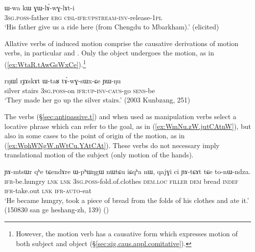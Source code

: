 \begin{exe}
\ex \label{ex:GWlAwGlAti}
\gll  ɯ-wa kɯ ɣɯ-lɤ́-wɣ-lɤt-i \\
\textsc{3sg}.\textsc{poss}-father \textsc{erg} \textsc{cisl}-\textsc{ifr}:\textsc{upstream}-\textsc{inv}-release-\textsc{1pl} \\
\glt `His father give us a ride here (from Chengdu to Mbarkham).' (elicited)
\end{exe}

Allative verbs of induced motion comprise the causative derivations of motion verbs, in particular  and . Only the object undergoes the motion, as in (\ref{ex:WtaR.tAwGsWxCe}).\footnote{However, the motion verb  has a causative form  which expresses motion of both subject and object (§\ref{sec:sig.caus.appl.comitative}). }

\begin{exe}
\ex \label{ex:WtaR.tAwGsWxCe}
\gll rŋɯl rɟɤskɤt ɯ-taʁ tɤ́-wɣ-sɯx-ɕe ɲɯ-ŋu \\
silver stairs \textsc{3sg}.\textsc{poss}-on \textsc{ifr}:\textsc{up}-\textsc{inv}-\textsc{caus}-go \textsc{sens}-be \\
\glt `They made her go up the silver stairs.' (2003 Kunbzang, 251)
\end{exe}


The verbs  (§\ref{sec:antipassive.t}) and  when used as manipulation verbs select a locative phrase which can refer to the goal, as in (\ref{ex:WmNu.zW.jutCAtnW}), but also in some cases to the point of origin of the motion, as in (\ref{ex:WphWNgW.nWtCu.YAtCAt}). These verbs do not necessary imply translational motion of the subject (only motion of the hands).

\begin{exe}
\ex \label{ex:WphWNgW.nWtCu.YAtCAt}
\gll ɲɤ-mtsɯr qʰe tɕendɤre ɯ-pʰɯŋgɯ nɯtɕu iɕqʰa nɯ, qajɣi ci ɲɤ-tɕɤt tɕe to-nɯ-ndza. \\
\textsc{ifr}-be.hungry \textsc{lnk} \textsc{lnk} \textsc{3sg}.\textsc{poss}-fold.of.clothes \textsc{dem}.\textsc{loc} \textsc{filler} \textsc{dem} bread \textsc{indef} \textsc{ifr}-take.out \textsc{lnk} \textsc{ifr}-\textsc{auto}-eat \\
\glt `He became hungry, took a piece of bread from the folds of his clothes and ate it.' (150830 san ge heshang-zh, 139) ()
\end{exe}

